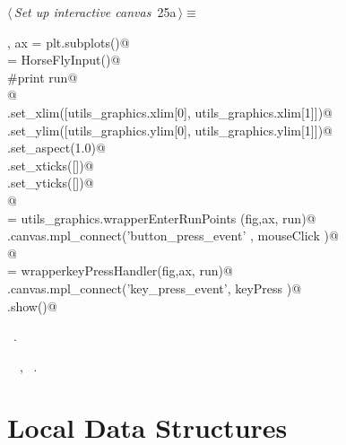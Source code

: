 \documentclass[11.5pt]{report}
\begin{document}
\begin{flushleft} \small\label{scrap20}\raggedright\small
{} $\langle\,${\itshape Set up interactive canvas}\nobreak\ {\footnotesize {25a}}$\,\rangle\equiv$
\vspace{-1ex}
\begin{list}{}{} \item
\mbox{}\verb@fig, ax =  plt.subplots()@\\
\mbox{}\verb@run = HorseFlyInput()@\\
\mbox{}\verb@#print run@\\
\mbox{}\verb@    @\\
\mbox{}\verb@ax.set_xlim([utils_graphics.xlim[0], utils_graphics.xlim[1]])@\\
\mbox{}\verb@ax.set_ylim([utils_graphics.ylim[0], utils_graphics.ylim[1]])@\\
\mbox{}\verb@ax.set_aspect(1.0)@\\
\mbox{}\verb@ax.set_xticks([])@\\
\mbox{}\verb@ax.set_yticks([])@\\
\mbox{}\verb@      @\\
\mbox{}\verb@mouseClick   = utils_graphics.wrapperEnterRunPoints (fig,ax, run)@\\
\mbox{}\verb@fig.canvas.mpl_connect('button_press_event' , mouseClick )@\\
\mbox{}\verb@      @\\
\mbox{}\verb@keyPress     = wrapperkeyPressHandler(fig,ax, run)@\\
\mbox{}\verb@fig.canvas.mpl_connect('key_press_event', keyPress   )@\\
\mbox{}\verb@plt.show()@\\
\mbox{}\verb@@{\NWsep}
\end{list}
\vspace{-1.5ex}
\footnotesize
\begin{list}{}{\setlength{\itemsep}{-\parsep}\setlength{\itemindent}{-\leftmargin}}
\item \NWtxtMacroRefIn\ .
\item \NWtxtIdentsUsed\nobreak\  \verb@HorseFlyInput@\nobreak\ , \verb@wrapperkeyPressHandler@\nobreak\ .
\item{}
\end{list}
\vspace{4ex}
\end{flushleft}
\section{Local Data Structures}
\end{document}
